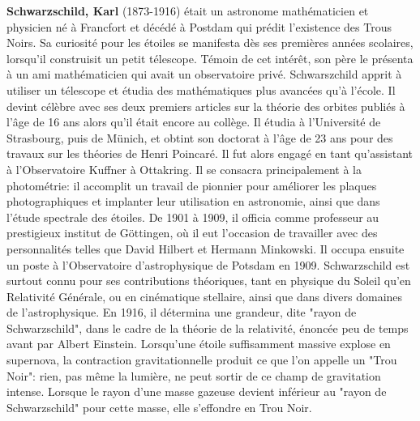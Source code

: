 \textbf{Schwarzschild, Karl} (1873-1916) était un astronome mathématicien et physicien né à Francfort et décédé à Postdam qui prédit l'existence des Trous Noirs. Sa curiosité pour les étoiles se manifesta dès ses premières années scolaires, lorsqu'il construisit un petit télescope. Témoin de cet intérêt, son père le présenta à un ami mathématicien qui avait un observatoire privé. Schwarszchild apprit à utiliser un télescope et étudia des mathématiques plus avancées qu'à l'école. Il devint célèbre avec ses deux premiers articles sur la théorie des orbites publiés à l'âge de 16 ans alors qu'il était encore au collège. Il étudia à l'Université de Strasbourg, puis de Münich, et obtint son doctorat à l'âge de 23 ans pour des travaux sur les théories de Henri Poincaré. Il fut alors engagé en tant qu'assistant à l'Observatoire Kuffner à Ottakring. Il se consacra principalement à la photométrie: il accomplit un travail de pionnier pour améliorer les plaques photographiques et implanter leur utilisation en astronomie, ainsi que dans l'étude spectrale des étoiles. De 1901 à 1909, il officia comme professeur au prestigieux institut de Göttingen, où il eut l'occasion de travailler avec des personnalités telles que David Hilbert et Hermann Minkowski. Il occupa ensuite un poste à l'Observatoire d'astrophysique de Potsdam en 1909. Schwarzschild est surtout connu pour ses contributions théoriques, tant en physique du Soleil qu'en Relativité Générale, ou en cinématique stellaire, ainsi que dans divers domaines de l'astrophysique. En 1916, il détermina une grandeur, dite "rayon de Schwarzschild", dans le cadre de la théorie de la relativité, énoncée peu de temps avant par Albert Einstein. Lorsqu'une étoile suffisamment massive explose en supernova, la contraction gravitationnelle produit ce que l'on appelle un "Trou Noir": rien, pas même la lumière, ne peut sortir de ce champ de gravitation intense. Lorsque le rayon d'une masse gazeuse devient inférieur au "rayon de Schwarzschild" pour cette masse, elle s'effondre en Trou Noir.

